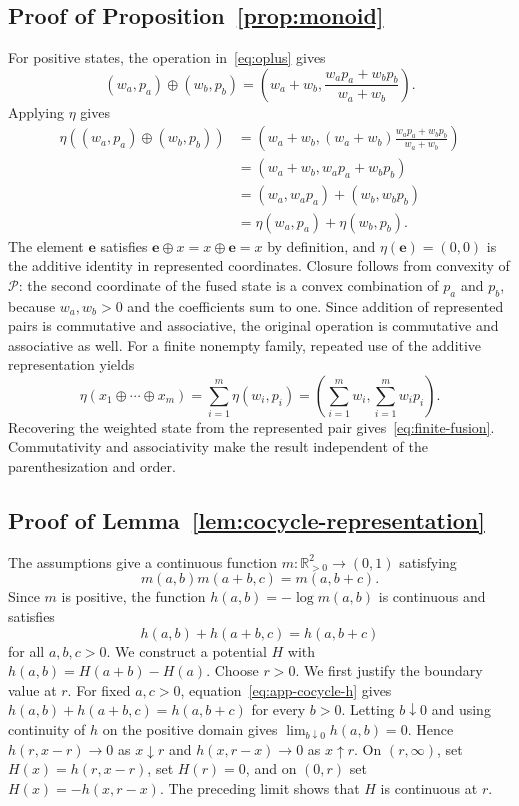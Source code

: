 \documentclass[runningheads]{llncs}
\newcommand{\R}{\mathbb{R}}
\newcommand{\Pcal}{\mathcal{P}}
\newcommand{\e}{\mathbf{e}}
\begin{document}
\subsection*{Proof of Proposition~\ref{prop:monoid}}

For positive states, the operation in~\eqref{eq:oplus} gives
\begin{equation*}
  (w_a,p_a)\oplus(w_b,p_b)
  =
  \left(w_a+w_b,\frac{w_ap_a+w_bp_b}{w_a+w_b}\right).
\end{equation*}
Applying $\eta$ gives
\begin{align*}
  \eta((w_a,p_a)\oplus(w_b,p_b))
  &=\left(w_a+w_b,(w_a+w_b)\frac{w_ap_a+w_bp_b}{w_a+w_b}\right)\\
  &=(w_a+w_b,w_ap_a+w_bp_b)\\
  &=(w_a,w_ap_a)+(w_b,w_bp_b)\\
  &=\eta(w_a,p_a)+\eta(w_b,p_b).
\end{align*}
The element $\e$ satisfies $\e\oplus x=x\oplus\e=x$ by definition, and $\eta(\e)=(0,0)$ is the additive identity in represented coordinates. Closure follows from convexity of $\Pcal$: the second coordinate of the fused state is a convex combination of $p_a$ and $p_b$, because $w_a,w_b>0$ and the coefficients sum to one. Since addition of represented pairs is commutative and associative, the original operation is commutative and associative as well. For a finite nonempty family, repeated use of the additive representation yields
\begin{equation*}
  \eta(x_1\oplus\cdots\oplus x_m)
  =\sum_{i=1}^m\eta(w_i,p_i)
  =\left(\sum_{i=1}^m w_i,\sum_{i=1}^m w_ip_i\right).
\end{equation*}
Recovering the weighted state from the represented pair gives~\eqref{eq:finite-fusion}. Commutativity and associativity make the result independent of the parenthesization and order.

\subsection*{Proof of Lemma~\ref{lem:cocycle-representation}}

The assumptions give a continuous function $m:\R_{>0}^2\to(0,1)$ satisfying
\begin{equation*}
  m(a,b)m(a+b,c)=m(a,b+c).
\end{equation*}
Since $m$ is positive, the function $h(a,b)=-\log m(a,b)$ is continuous and satisfies
\begin{equation}
  h(a,b)+h(a+b,c)=h(a,b+c)
  \label{eq:app-cocycle-h}
\end{equation}
for all $a,b,c>0$. We construct a potential $H$ with $h(a,b)=H(a+b)-H(a)$.
Choose $r>0$. We first justify the boundary value at $r$. For fixed $a,c>0$, equation~\eqref{eq:app-cocycle-h} gives $h(a,b)+h(a+b,c)=h(a,b+c)$ for every $b>0$. Letting $b\downarrow0$ and using continuity of $h$ on the positive domain gives $\lim_{b\downarrow0}h(a,b)=0$. Hence $h(r,x-r)\to0$ as $x\downarrow r$ and $h(x,r-x)\to0$ as $x\uparrow r$. On $(r,\infty)$, set $H(x)=h(r,x-r)$, set $H(r)=0$, and on $(0,r)$ set $H(x)=-h(x,r-x)$. The preceding limit shows that $H$ is continuous at $r$.
\end{document}
